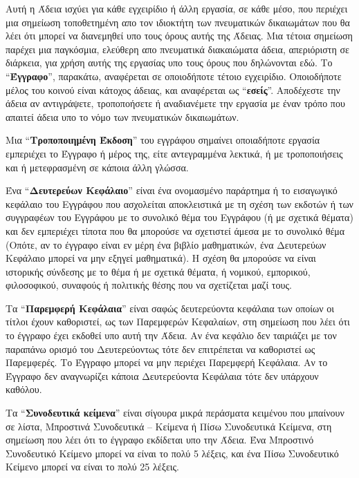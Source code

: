 Αυτή η Άδεια ισχύει για κάθε εγχειρίδιο ή άλλη εργασία, σε κάθε μέσο, που περιέχει μια σημείωση τοποθετημένη απο τον ιδιοκτήτη των πνευματικών δικαιωμάτων που θα λέει ότι μπορεί να διανεμηθεί υπο τους όρους αυτής της Άδειας. Μια τέτοια σημείωση παρέχει μια παγκόσμια, ελεύθερη απο πνευματικά διακαιώματα άδεια, απεριόριστη σε διάρκεια, για χρήση αυτής της εργασίας υπο τους όρους που δηλώνονται εδώ. Το ``\textbf{Έγγραφο}'', παρακάτω, αναφέρεται σε οποιοδήποτε τέτοιο εγχειρίδιο. Οποιοδήποτε μέλος του κοινού είναι κάτοχος άδειας, και αναφέρεται ως ``\textbf{εσείς}''.  Αποδέχεστε την άδεια αν αντιγράψετε, τροποποήσετε ή αναδιανέμετε την εργασία με έναν τρόπο που απαιτεί άδεια υπο το νόμο των πνευματικών δικαιωμάτων.

Μια ``\textbf{Τροποποιημένη Έκδοση}'' του εγγράφου σημαίνει οποιαδήποτε εργασία εμπεριέχει το Έγγραφο ή μέρος της, είτε αντεγραμμένα λεκτικά, ή με τροποποιήσεις και ή μετεφρασμένη σε κάποια άλλη γλώσσα.

Ένα ``\textbf{Δευτερεύων Κεφάλαιο}'' είναι ένα ονομασμένο παράρτημα ή το εισαγωγικό κεφάλαιο του Εγγράφου που ασχολείται αποκλειστικά με τη σχέση των εκδοτών ή των συγγραφέων του Εγγράφου με το συνολικό θέμα του Εγγράφου (ή με σχετικά θέματα) και δεν εμπεριέχει τίποτα που θα μπορούσε να σχετιστεί άμεσα με το συνολικό θέμα (Οπότε, αν το έγγραφο είναι εν μέρη ένα βιβλίο μαθηματικών, ένα Δευτερεύων Κεφάλαιο μπορεί να μην εξηγεί μαθηματικά). Η σχέση θα μπορούσε να είναι ιστορικής σύνδεσης με το θέμα ή με σχετικά θέματα, ή νομικού, εμπορικού, φιλοσοφικού, συναφούς ή πολιτικής θέσης που να σχετίζεται μαζί τους.

Τα ``\textbf{Παρεμφερή Κεφάλαια}'' είναι σαφώς δευτερεύοντα κεφάλαια των οποίων οι τίτλοι έχουν καθοριστεί, ως των Παρεμφερών Κεφαλαίων, στη σημείωση που λέει ότι το έγγραφο έχει εκδοθεί υπο αυτή την Άδεια. Αν ένα κεφάλιο δεν ταιριάζει με τον παραπάνω ορισμό του Δευτερεύοντως τότε δεν επιτρέπεται να καθοριστεί ως Παρεμφερές. Το Έγγραφο μπορεί να μην περιέχει Παρεμφερή Κεφάλαια.  Αν το Έγγραφο δεν αναγνωρίζει κάποια Δευτερεύοντα Κεφάλαια τότε δεν υπάρχουν καθόλου.

Τα ``\textbf{Συνοδευτικά κείμενα}'' είναι σίγουρα μικρά περάσματα κειμένου που μπαίνουν σε λίστα, Μπροστινά Συνοδευτικά – Κείμενα ή Πίσω Συνοδευτικά Κείμενα, στη σημείωση που λέει ότι το έγγραφο εκδίδεται υπο την Άδεια. Ένα Μπροστινό Συνοδευτικό Κείμενο μπορεί να είναι το πολύ 5 λέξεις, και ένα Πίσω Συνοδευτικό Κείμενο μπορεί να είναι το πολύ 25 λέξεις.

